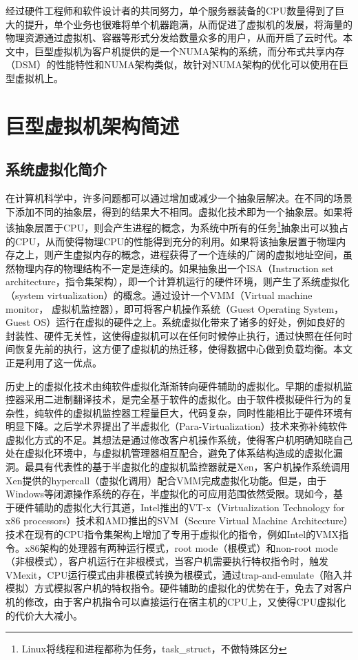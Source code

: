 经过硬件工程师和软件设计者的共同努力，单个服务器装备的CPU数量得到了巨大的提升，单个业务也很难将单个机器跑满，从而促进了虚拟机的发展，将海量的物理资源通过虚拟机、容器等形式分发给数量众多的用户，从而开启了云时代。本文中，巨型虚拟机为客户机提供的是一个NUMA架构的系统，而分布式共享内存（DSM）的性能特性和NUMA架构类似，故针对NUMA架构的优化可以使用在巨型虚拟机上。
\section{巨型虚拟机架构简述}
\subsection{系统虚拟化简介}
在计算机科学中，许多问题都可以通过增加或减少一个抽象层解决。在不同的场景下添加不同的抽象层，得到的结果大不相同。虚拟化技术即为一个抽象层。如果将该抽象层置于CPU，则会产生进程的概念，为系统中所有的任务\footnote{Linux将线程和进程都称为任务，task\_struct，不做特殊区分}抽象出可以独占的CPU，从而使得物理CPU的性能得到充分的利用。如果将该抽象层置于物理内存之上，则产生虚拟内存的概念，进程获得了一个连续的广阔的虚拟地址空间，虽然物理内存的物理结构不一定是连续的。如果抽象出一个ISA（Instruction set architecture，指令集架构），即一个计算机运行的硬件环境，则产生了系统虚拟化（system virtualization）的概念。通过设计一个VMM（Virtual machine monitor， 虚拟机监控器），即可将客户机操作系统（Guest Operating System， Guest OS）运行在虚拟的硬件之上。系统虚拟化带来了诸多的好处，例如良好的封装性、硬件无关性\cite{sysv}，这使得虚拟机可以在任何时候停止执行，通过快照在任何时间恢复先前的执行，这方便了虚拟机的热迁移，使得数据中心做到负载均衡。本文正是利用了这一优点。

历史上的虚拟化技术由纯软件虚拟化渐渐转向硬件辅助的虚拟化。早期的虚拟机监控器采用二进制翻译技术，是完全基于软件的虚拟化。由于软件模拟硬件行为的复杂性，纯软件的虚拟机监控器工程量巨大，代码复杂，同时性能相比于硬件环境有明显下降。之后学术界提出了半虚拟化（Para-Virtualization）技术来弥补纯软件虚拟化方式的不足。其想法是通过修改客户机操作系统，使得客户机明确知晓自己处在虚拟化环境中，与虚拟机管理器相互配合，避免了体系结构造成的虚拟化漏洞。最具有代表性的基于半虚拟化的虚拟机监控器就是Xen\cite{artofxen}，客户机操作系统调用Xen提供的hypercall（虚拟化调用）配合VMM完成虚拟化功能。但是，由于Windows等闭源操作系统的存在，半虚拟化的可应用范围依然受限。现如今，基于硬件辅助的虚拟化大行其道，Intel推出的VT-x（Virtualization Technology for x86 processors）技术\cite{intelv}和AMD推出的SVM（Secure Virtual Machine Architecture）技术\cite{amdv}在现有的CPU指令集架构上增加了专用于虚拟化的指令，例如Intel的VMX指令\cite{intelSDM}。x86架构的处理器有两种运行模式，root mode（根模式）和non-root mode（非根模式），客户机运行在非根模式，当客户机需要执行特权指令时，触发VMexit，CPU运行模式由非根模式转换为根模式，通过trap-and-emulate（陷入并模拟）方式模拟客户机的特权指令。硬件辅助的虚拟化的优势在于，免去了对客户机的修改，由于客户机指令可以直接运行在宿主机的CPU上，又使得CPU虚拟化的代价大大减小。

